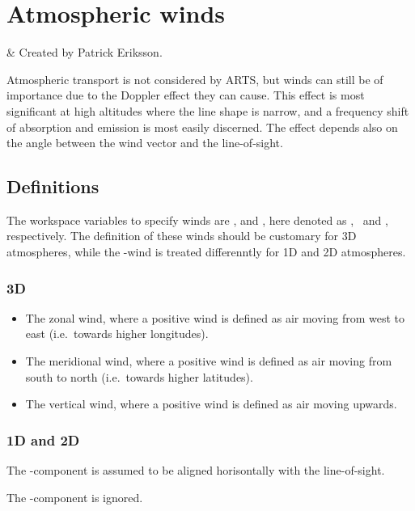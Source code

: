 \chapter{Atmospheric winds}
 \label{sec:winds}


  & Created by Patrick Eriksson.\\
 \stophistory


 Atmospheric transport is not considered by ARTS, but winds can still be of
 importance due to the Doppler effect they can cause. This effect is most
 significant at high altitudes where the line shape is narrow, and a frequency
 shift of absorption and emission is most easily discerned. The effect depends
 also on the angle between the wind vector and the line-of-sight.



\section{Definitions}
\label{sec:winds:defs}

The workspace variables to specify winds are ,
 and , here denoted as
\WindWE, \WindSN\ and \WindVe, respectively. The definition of these winds
should be customary for 3D atmospheres, while the \WindSN-wind is treated
differenntly for 1D and 2D atmospheres.

\subsection{3D}
%
\begin{itemize}
\item[\WindWE] The zonal wind, where a positive wind is defined as air moving
  from west to east (i.e.\ towards higher longitudes).
\item[\WindSN] The meridional wind, where a positive wind is defined as air
  moving from south to north (i.e.\ towards higher latitudes).
\item[\WindVe] The vertical wind, where a positive wind is defined as air
  moving upwards.
\end{itemize}


\subsection{1D and 2D}
%
The \WindSN-component is assumed to be aligned horisontally with the
line-of-sight. 

 The \WindWE-component is ignored.
